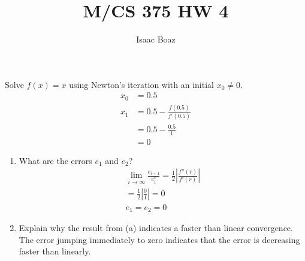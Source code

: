 \documentclass{article}
\title{\vspace{-5ex}M/CS 375 HW 4}
\author{Isaac Boaz}
\begin{document}
\maketitle

Solve \(f(x) = x\) using Newton's iteration with an initial \(x_0 \ne 0\).
\begin{align*}
    x_0 & = 0.5                          \\
    x_1 & = 0.5 - \frac{f(0.5)}{f'(0.5)} \\
        & = 0.5 - \frac{0.5}{1}          \\
        & = 0
\end{align*}
\begin{enumerate}[label=(\alph*)]
    \item What are the errors \(e_1\) and \(e_2\)?
          \begin{align*}
              \lim_{i \to \infty} \frac{e_{i+1}}{e_i^c} = \frac{1}{2}\left|\frac{f''(r)}{f'(r)}\right| \\
              = \frac{1}{2}\left|\frac{0}{1}\right| = 0                                                \\
              e_1 = e_2 = 0
          \end{align*}
    \item Explain why the result from (a) indicates a faster than linear convergence. \\
          The error jumping immediately to zero indicates that the error is decreasing faster than linearly.
\end{enumerate}
\end{document}
